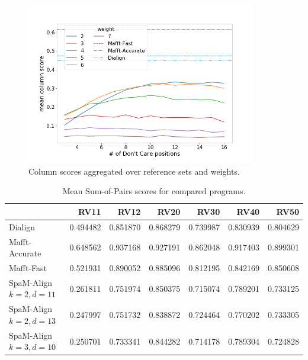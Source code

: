\begin{figure}[H]
	\centering
	\includegraphics[width=0.9\textwidth]{../alignment-evaluation/cs-by-pattern-params.png}
	\caption{Column scores aggregated over \bb reference sets and weights.}
	\label{fig:cs-by-pattern-params}
\end{figure}

\begin{table}[h]
	\centering
	\begin{tabular}{lrrrrrr}
		\toprule
		{} &      RV11 &      RV12 &      RV20 &      RV30 &      RV40 &      RV50 \\
		\midrule
		Dialign             &  0.494482 &  0.851870 &  0.868279 &  0.739987 &  0.830939 &  0.804629 \\
		Mafft-Accurate      &  0.648562 &  0.937168 &  0.927191 &  0.862048 &  0.917403 &  0.899301 \\
		Mafft-Fast          &  0.521931 &  0.890052 &  0.885096 &  0.812195 &  0.842169 &  0.850608 \\
		SpaM-Align $k=2, d=11$ &  0.261811 &  0.751974 &  0.850375 &  0.715074 &  0.789201 &  0.733125 \\
		SpaM-Align $k=2, d=13$ &  0.247997 &  0.751732 &  0.838872 &  0.724464 &  0.770202 &  0.733305 \\
		SpaM-Align $k=3, d=10$ &  0.250701 &  0.733341 &  0.844282 &  0.714178 &  0.789304 &  0.724828 \\
		\bottomrule
	\end{tabular}
	\caption{Mean Sum-of-Pairs scores for compared programs.}
	\label{tab:sop-scores}
\end{table}

